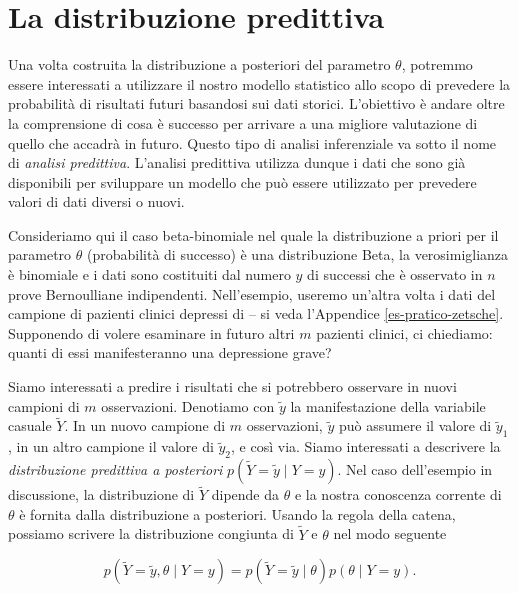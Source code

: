 \documentclass[
  11pt,
]{krantz}
\theoremstyle{definition}
\theoremstyle{definition}
\theoremstyle{definition}
\theoremstyle{definition}
\theoremstyle{remark}
\begin{document}
\hypertarget{la-distribuzione-predittiva}{%
\section{La distribuzione predittiva}\label{la-distribuzione-predittiva}}

Una volta costruita la distribuzione a posteriori del parametro \(\theta\), potremmo essere interessati a utilizzare il nostro modello statistico allo scopo di prevedere la probabilità di risultati futuri basandosi sui dati storici. L'obiettivo è andare oltre la comprensione di cosa è successo per arrivare a una migliore valutazione di quello che accadrà in futuro. Questo tipo di analisi inferenziale va sotto il nome di \emph{analisi predittiva}. L'analisi predittiva utilizza dunque i dati che sono già disponibili per sviluppare un modello che può essere utilizzato per prevedere valori di dati diversi o nuovi.

Consideriamo qui il caso beta-binomiale nel quale la distribuzione a priori per il parametro \(\theta\) (probabilità di successo) è una distribuzione Beta, la verosimiglianza è binomiale e i dati sono costituiti dal numero \(y\) di successi che è osservato in \(n\) prove Bernoulliane indipendenti. Nell'esempio, useremo un'altra volta i dati del campione di pazienti clinici depressi di \citet{zetschefuture2019} -- si veda l'Appendice \ref{es-pratico-zetsche}. Supponendo di volere esaminare in futuro altri \(m\) pazienti clinici, ci chiediamo: quanti di essi manifesteranno una depressione grave?

Siamo interessati a predire i risultati che si potrebbero osservare in nuovi campioni di \(m\) osservazioni. Denotiamo con \(\tilde{y}\) la manifestazione della variabile casuale \(\tilde{Y}\). In un nuovo campione di \(m\) osservazioni, \(\tilde{y}\) può assumere il valore di \(\tilde{y}_1\), in un altro campione il valore di \(\tilde{y}_2\), e così via. Siamo interessati a descrivere la \emph{distribuzione predittiva a posteriori} \(p(\tilde{Y} = \tilde{y} \mid Y = y)\). Nel caso dell'esempio in discussione, la distribuzione di \(\tilde{Y}\) dipende da \(\theta\) e la nostra conoscenza corrente di \(\theta\) è fornita dalla distribuzione a posteriori. Usando la regola della catena, possiamo scrivere la distribuzione congiunta di \(\tilde{Y}\) e \(\theta\) nel modo seguente

\begin{equation}
p(\tilde{Y} = \tilde{y}, \theta \mid Y = y) = p(\tilde{Y} = \tilde{y} \mid \theta) p(\theta \mid Y = y).
\end{equation}
\end{document}
